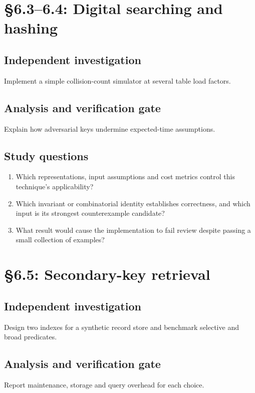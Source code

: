 \documentclass[11pt,letterpaper]{article}
\begin{document}
\section{\S 6.3--6.4: Digital searching and hashing}
\subsection{Independent investigation}
Implement a simple collision-count simulator at several table load factors.
\subsection{Analysis and verification gate}
Explain how adversarial keys undermine expected-time assumptions.
\subsection{Study questions}
\begin{enumerate}
\item Which representations, input assumptions and cost metrics control this technique's applicability?
\item Which invariant or combinatorial identity establishes correctness, and which input is its strongest counterexample candidate?
\item What result would cause the implementation to fail review despite passing a small collection of examples?
\end{enumerate}

\section{\S 6.5: Secondary-key retrieval}
\subsection{Independent investigation}
Design two indexes for a synthetic record store and benchmark selective and broad predicates.
\subsection{Analysis and verification gate}
Report maintenance, storage and query overhead for each choice.
\end{document}
